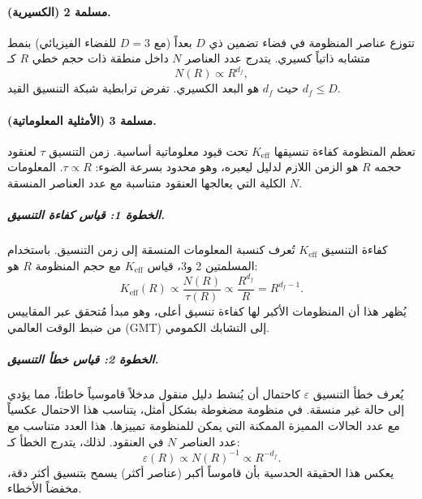 \documentclass[12pt,a4paper]{article}
\newcommand{\Ke}{K_{\mathrm{eff}}}
\theoremstyle{remark}
\begin{document}
	\paragraph{مسلمة 2 (الكسيرية).}
	تتوزع عناصر المنظومة في فضاء تضمين ذي \(D\) بعداً (مع \(D = 3\) للفضاء الفيزيائي) بنمط متشابه ذاتياً كسيري. يتدرج عدد العناصر \(N\) داخل منطقة ذات حجم خطي \(R\) كـ
	\begin{equation}
		N(R) \propto R^{d_f},
		\label{eq:fractal_dim}
	\end{equation}
	حيث \(d_f\) هو البعد الكسيري. تفرض ترابطية شبكة التنسيق القيد \(d_f \le D\).
	
	\paragraph{مسلمة 3 (الأمثلية المعلوماتية).}
	تعظم المنظومة كفاءة تنسيقها \(\Ke\) تحت قيود معلوماتية أساسية. زمن التنسيق \(\tau\) لعنقود حجمه \(R\) هو الزمن اللازم لدليل ليعبره، وهو محدود بسرعة الضوء: \(\tau \propto R\). المعلومات الكلية التي يعالجها العنقود متناسبة مع عدد العناصر المنسقة \(N\).
	
	\subparagraph*{الخطوة 1: قياس كفاءة التنسيق.}
	كفاءة التنسيق \(\Ke\) تُعرف كنسبة المعلومات المنسقة إلى زمن التنسيق. باستخدام المسلمتين 2 و3، قياس \(\Ke\) مع حجم المنظومة \(R\) هو:
	\begin{equation}
		\Ke(R) \propto \frac{N(R)}{\tau(R)} \propto \frac{R^{d_f}}{R} = R^{d_f - 1}.
		\label{eq:keff_scale}
	\end{equation}
	يُظهر هذا أن المنظومات الأكبر لها كفاءة تنسيق أعلى، وهو مبدأ مُتحقق عبر المقاييس من ضبط الوقت العالمي (GMT) إلى التشابك الكمومي.
	
	\subparagraph*{الخطوة 2: قياس خطأ التنسيق.}
	يُعرف خطأ التنسيق \(\varepsilon\) كاحتمال أن يُنشط دليل منقول مدخلاً قاموسياً خاطئاً، مما يؤدي إلى حالة غير منسقة. في منظومة مضغوطة بشكل أمثل، يتناسب هذا الاحتمال عكسياً مع عدد الحالات المميزة الممكنة التي يمكن للمنظومة تمييزها. هذا العدد متناسب مع عدد العناصر \(N\) في العنقود. لذلك، يتدرج الخطأ كـ:
	\begin{equation}
		\varepsilon(R) \propto N(R)^{-1} \propto R^{-d_f}.
		\label{eq:error_scale}
	\end{equation}
	يعكس هذا الحقيقة الحدسية بأن قاموساً أكبر (عناصر أكثر) يسمح بتنسيق أكثر دقة، مخفضاً الأخطاء.
	
\end{document}
